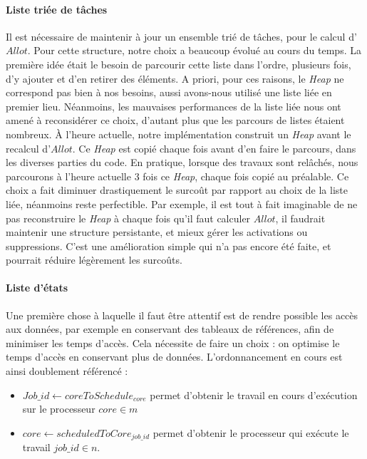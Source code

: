 		\paragraph{Liste triée de tâches}
		Il est nécessaire de maintenir à jour un ensemble trié de tâches, pour le 
		calcul d'$Allot$. Pour cette structure, notre choix a beaucoup évolué au cours du temps. 
		La première idée était le besoin de parcourir cette liste dans l'ordre, plusieurs fois, 
		d'y ajouter et d'en retirer des éléments. A priori, pour ces raisons, le \textit{Heap} ne 
		correspond pas bien à nos besoins, aussi avons-nous utilisé une liste liée en 
		premier lieu. Néanmoins, les mauvaises performances de la liste liée 
		nous ont amené à reconsidérer ce choix, d'autant plus que les parcours de listes étaient nombreux. 
		À l'heure actuelle, notre implémentation construit un \textit{Heap} avant le recalcul d'$Allot$.
		Ce \textit{Heap} est copié chaque fois avant d'en faire le parcours, dans les diverses parties du code.
		En pratique, lorsque des travaux sont relâchés, nous parcourons à l'heure actuelle 3 fois ce \textit{Heap}, 
		chaque fois copié au préalable. 
		Ce choix a fait diminuer drastiquement le surcoût par rapport au choix de la liste liée, 
		néanmoins reste perfectible.
		Par exemple, il est tout à fait imaginable de ne pas reconstruire le \textit{Heap} à chaque fois qu'il faut 
		calculer $Allot$, il faudrait maintenir une structure persistante, et mieux gérer les activations ou suppressions. 
		C'est une amélioration simple qui n'a pas encore été faite, et pourrait réduire légèrement les surcoûts.
		\newline
		
		\paragraph{Liste d'états}
		Une première chose à laquelle il faut être attentif est de rendre possible les accès 
		aux données, par exemple en conservant des tableaux de références, afin de minimiser les temps 
		d'accès. Cela nécessite de faire un choix : on optimise le temps d'accès en conservant plus de données. 
		L'ordonnancement en cours est ainsi doublement référencé : 
		\begin{itemize}
			\setlength\itemsep{0.1em}
			\item $Job\_id \leftarrow coreToSchedule_{core}$ permet d'obtenir le travail en cours d'exécution sur le processeur $core \in m$
			\item $core \leftarrow scheduledToCore_{job\_id}$ permet d'obtenir le processeur qui exécute le travail $job\_id \in n$.
		\end{itemize}

